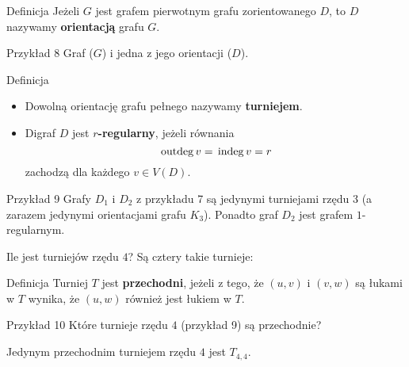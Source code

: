 \documentclass[a4paper,10pt]{beamer}
\newcommand{\outdeg}{{\,\rm{outdeg}\,}}
\newcommand{\indeg}{{\,\rm{indeg}\,}}
\begin{document}
\begin{frame}

\begin{block}{Definicja}
Jeżeli $G$ jest grafem pierwotnym grafu zorientowanego $D$, to $D$ nazywamy {\bf orientacją} grafu $G$.
\end{block}

\begin{exampleblock}{Przykład 8}
Graf ($G$) i jedna z jego orientacji ($D$).


\end{exampleblock}

\end{frame}


\begin{frame}

\begin{block}{Definicja}
\begin{itemize}
\item Dowolną orientację grafu pełnego nazywamy {\bf turniejem}.
\item Digraf $D$ jest {\bf $r$-regularny}, jeżeli równania $$\outdeg v=\indeg v=r$$ zachodzą dla każdego $v\in V(D)$.
\end{itemize}
\end{block}

\begin{exampleblock}{Przykład 9}
Grafy $D_1$ i $D_2$ z przykładu 7 są jedynymi turniejami rzędu $3$ (a zarazem jedynymi orientacjami grafu $K_3$). Ponadto graf $D_2$ jest grafem $1$-regularnym.

\medskip

Ile jest turniejów rzędu $4$? Są cztery takie turnieje:


\end{exampleblock}

\end{frame}



\begin{frame}

\begin{block}{Definicja}
Turniej $T$ jest {\bf przechodni}, jeżeli z tego, że $(u,v)$ i $(v,w)$ są łukami w $T$ wynika, że $(u,w)$ również jest łukiem w $T$.
\end{block}

\bigskip

\begin{exampleblock}{Przykład 10}
Które turnieje rzędu $4$ (przykład 9) są przechodnie?

\medskip

Jedynym przechodnim turniejem rzędu $4$ jest $T_{4,4}$.
\end{exampleblock}

\end{frame}
\end{document}
